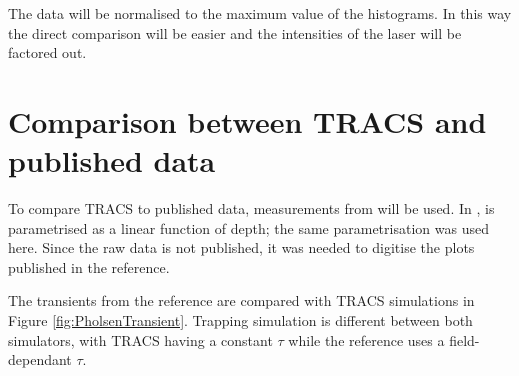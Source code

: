 

The data will be normalised to the maximum value of the histograms. In this way the direct comparison will be easier and the intensities of the laser will be factored out.%

\section{Comparison between TRACS and published data}

To compare TRACS to published data, measurements from \cite{Pholsen} will be used. In \cite{Pholsen}, \neff is parametrised as a linear function of depth; the same parametrisation was used here. Since the raw data is not published, it was needed to digitise the plots published in the reference.
%

The transients from the reference are compared with TRACS simulations in Figure \ref{fig:PholsenTransient}.  Trapping simulation is different between both simulators, with TRACS having a constant $\tau$ while the reference uses a field-dependant $\tau$.%


